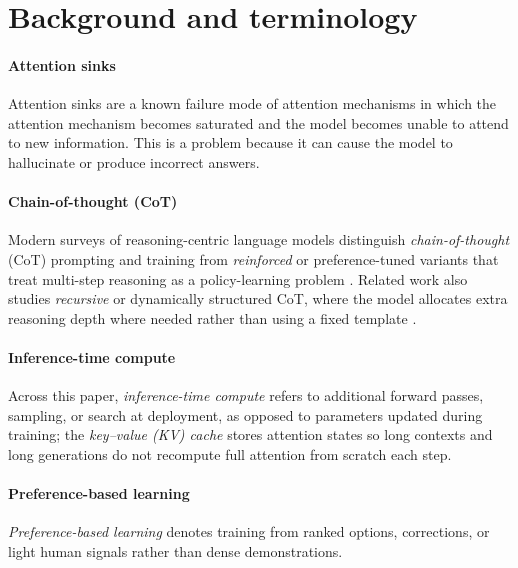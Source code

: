 \documentclass[conference]{IEEEtran}
\begin{document}
\section{Background and terminology}

\paragraph{Attention sinks} Attention sinks are a known failure mode of attention mechanisms in which the attention mechanism becomes saturated and the model becomes unable to attend to new information. This is a problem because it can cause the model to hallucinate or produce incorrect answers.

\paragraph{Chain-of-thought (CoT)} Modern surveys of reasoning-centric language models distinguish \emph{chain-of-thought} (CoT) prompting and training from \emph{reinforced} or preference-tuned variants that treat multi-step reasoning as a policy-learning problem \cite{xu2025reasoning}. Related work also studies \emph{recursive} or dynamically structured CoT, where the model allocates extra reasoning depth where needed rather than using a fixed template \cite{sinha2025drcot}.

\paragraph{Inference-time compute} Across this paper, \emph{inference-time compute} refers to additional forward passes, sampling, or search at deployment, as opposed to parameters updated during training; the \emph{key--value (KV) cache} stores attention states so long contexts and long generations do not recompute full attention from scratch each step.

\paragraph{Preference-based learning} \emph{Preference-based learning} denotes training from ranked options, corrections, or light human signals rather than dense demonstrations.
\end{document}
